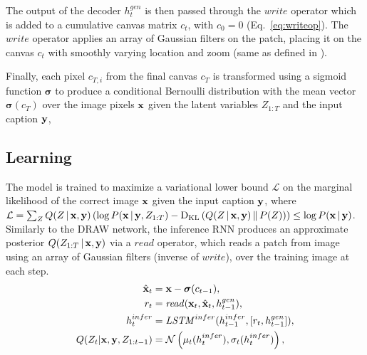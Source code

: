 \documentclass{article} %
\newcommand{\Eqref}[1]{Eq.~\ref{#1}} %
\newcommand{\given}{\,|\,}
\newcommand{\kldiv}{\mathrm{D}_{\rm KL}}
\newcommand{\klBars}{\,\|\,}
\newcommand{\sigmoid}{\boldsymbol{\sigma}}
\newcommand{\hdec}{h^{gen}}
\newcommand{\henc}{h^{infer}}
\newcommand{\readop}{\mathit{read}}
\newcommand{\writeop}{\mathit{write}}
\newcommand{\encoder}{\mathit{LSTM}^{infer}}
\newcommand{\canv}{c}
\newcommand{\Lat}{Z}
\newcommand{\icaption}{{\bf{y}}}
\newcommand{\oimage}{{\bf{x}}}
\newcommand{\post}{Q}
\newcommand{\loss}{\mathcal{L}}
\newcommand{\lloss}{\mathcal{L}^{z}}
\newcommand{\rloss}{\mathcal{L}^{x}}
\begin{document}
The output of the decoder $\hdec_t$ is then passed through the $\writeop$ operator 
which is added to a cumulative canvas matrix $c_t$, with $c_0=0$ (\Eqref{eq:writeop}). 
The $\writeop$ operator
applies an array of Gaussian filters on the patch, placing 
it on the canvas $c_t$ with smoothly varying location and zoom (same as 
defined in \citep{gregor_draw}). 

Finally, each pixel $\canv_{T,i}$ from the final canvas $\canv_T$ is transformed using a sigmoid function $\sigmoid$ to produce a conditional Bernoulli 
distribution with the mean vector $\sigmoid(\canv_{T})$ over the image pixels 
$\oimage$ given the latent variables $\Lat_{1:T}$ and the input caption $\icaption$,



\subsection{Learning}

The model is trained to maximize a variational lower bound $\loss$ on the marginal likelihood of the correct image $\oimage$ given the input caption $\icaption$, where $\loss = \sum_{\Lat}Q(\Lat\given\oimage,\icaption)\left(\log P(\oimage\given\icaption, \Lat_{1:T}) - \kldiv\left(Q(\Lat\given\oimage,\icaption)\klBars P(\Lat)\right)\right) \le \log P(\oimage\given\icaption)$. %
Similarly to the DRAW network, the inference RNN produces an approximate posterior $Q(\Lat_{1:T}\given\oimage,\icaption)$ via a $\readop$ operator, which reads a patch from image using an array of Gaussian filters (inverse of $\writeop$), over the training image at each step. 
\begin{align}
\label{eq:x_hat}
\hat{\oimage}_t &= \oimage-\sigmoid(\canv_{t-1}),\\
\label{eq:read}
r_t &= \readop(\oimage_t, \hat{\oimage}_t, \hdec_{t-1}),\\
\henc_t &= \encoder(\henc_{t-1}, [r_t, \hdec_{t-1}]),\\
\post(\Lat_t|\oimage,\icaption,\Lat_{1:t-1}) &= \mathcal{N}\left(\mu_t(\henc_t), \sigma_t(\henc_t)\right),
\end{align}

\end{document}
